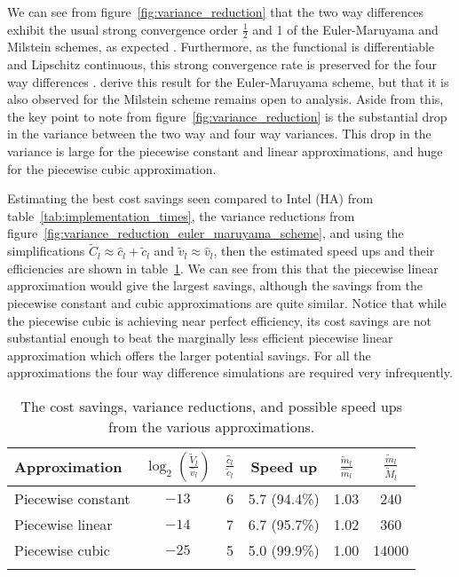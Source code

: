 \documentclass[manuscript,review]{acmart}
\begin{document}
We can see from figure~\ref{fig:variance_reduction} that the two way differences exhibit the usual strong convergence order $ \tfrac{1}{2} $ and 1 of the Euler-Maruyama and Milstein schemes, as expected \citep{kloeden1999numerical}. Furthermore, as the functional is differentiable and Lipschitz continuous, this strong convergence rate is preserved for the four way differences \citep{giles2020approximate,sheridan2020nested}. \citeauthor{giles2020approximate} \citep{giles2020approximate,sheridan2020nested} derive this result for the Euler-Maruyama scheme, but that it is also observed for the Milstein scheme remains open to analysis. Aside from this, the key point to note from figure~\ref{fig:variance_reduction} is the substantial drop in the variance between the two way and four way variances. This drop in the variance is large for the piecewise constant and linear approximations, and huge for the piecewise cubic approximation. 

Estimating the best cost savings seen compared to Intel (HA) from table~\ref{tab:implementation_times}, the variance reductions from figure~\ref{fig:variance_reduction_euler_maruyama_scheme}, and using the simplifications $ \tilde{C}_l \approx \hat{c}_l + \tilde{c}_l $ and $ \tilde{v}_l \approx  \hat{v}_l $, then the estimated speed ups and their efficiencies are shown in table~\ref{tab:savings}. We can see from this that the piecewise linear approximation would give the largest savings, although the savings from the piecewise constant and cubic approximations are quite similar. Notice that while the piecewise cubic is achieving near perfect efficiency, its cost savings are not substantial enough to beat the marginally less efficient piecewise linear approximation which offers the larger potential savings. For all the approximations the four way difference simulations are required very infrequently. 

\begin{table}[htb]
\caption{The cost savings, variance reductions, and possible speed ups from the various approximations.}
\label{tab:savings}
\begin{tabular}{lccccc}
Approximation  & $ {\log}_2 \left(\tfrac{\tilde{V}_l}{\hat{v}_l}\right) $ & $ \tfrac{\hat{c}_l}{\tilde{c}_l} $ & Speed up & $ \tfrac{\tilde{m}_l}{\hat{m}_l} $ & $ \tfrac{\tilde{m}_l}{\tilde{M}_l} $ \\[0.5em]
\hline
Piecewise constant & $ -13 $ & 6 & 5.7 (94.4\%) & 1.03 & 240 \\
Piecewise linear  & $ -14 $ & 7& 6.7 (95.7\%) & 1.02 & 360 \\
Piecewise cubic  & $ -25 $ & 5 & 5.0 (99.9\%)& 1.00 & 14000\\ & 
\end{tabular}
\end{table}
\end{document}
